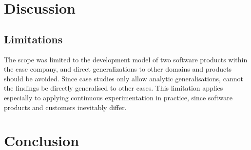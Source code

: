\documentclass[english]{tktltiki2}
\theoremstyle{definition}
\theoremstyle{remark}
\begin{document}
\begin{enumerate}




\section{Discussion}







\subsection{Limitations}
The scope was limited to the development model of two software products within the case company, and direct generalizations to other domains and products should be avoided. Since case studies only allow analytic generalisations, cannot the findings be directly generalised to other cases. This limitation applies especially to applying continuous experimentation in practice, since software products and customers inevitably differ.


\section{Conclusion}


\end{enumerate}
\end{document}
